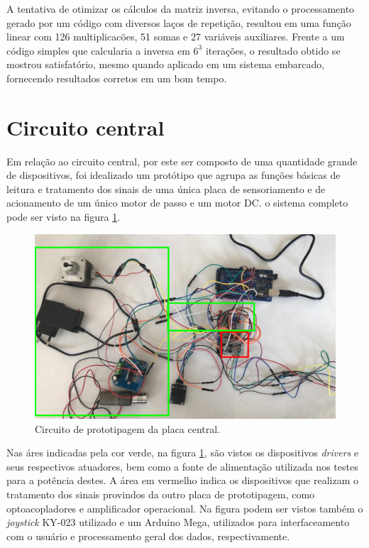 A tentativa de otimizar os cálculos da matriz inversa, evitando o processamento gerado
por um código com diversos laços de repetição, resultou em uma função linear com 126
multiplicacões, 51 somas e 27 variáveis auxiliares. Frente a um código simples que calcularia
a inversa em $6^3$ iterações, o resultado obtido se mostrou satisfatório, mesmo quando aplicado
em um sistema embarcado, fornecendo resultados corretos em um bom tempo.

\section{Circuito central}

Em relação ao circuito central, por este ser composto de uma quantidade grande de 
dispositivos, foi idealizado um protótipo que agrupa as funções básicas de leitura
e tratamento dos sinais de uma única placa de sensoriamento e de acionamento de um
único motor de passo e um motor DC. o sistema completo pode ser visto na figura
\ref{fig:proto-main}.

\begin{figure}[ht]
    \caption{Circuito de prototipagem da placa central.}

    \begin{centering}
        \includegraphics[width=1\columnwidth]{images/resultados/proto-main.jpeg} 
    \par\end{centering}

    \label{fig:proto-main}
\end{figure}

Nas áres indicadas pela cor verde, na figura \ref{fig:proto-main}, são vistos os 
dispositivos \textit{drivers} e seus respectivos atuadores, bem como a fonte de 
alimentação utilizada nos testes para a potência destes.
A área em vermelho indica os dispositivos que realizam o tratamento dos sinais 
provindos da outro placa de prototipagem, como optoacopladores e amplificador operacional.
Na figura podem ser vistos também o \textit{joystick} KY-023 utilizado e um Arduino Mega,
utilizados para interfaceamento com o usuário e processamento geral dos dados, respectivamente.

